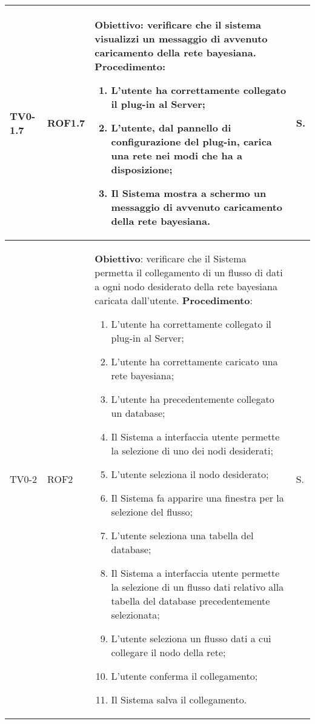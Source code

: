 \begin{longtable}{|C{.15\textwidth}|C{.13\textwidth}|m{.65\textwidth}|C{.08\textwidth}|}
TV0-1.7 & ROF1.7 &
	\textbf{Obiettivo}: verificare che il sistema visualizzi un messaggio di avvenuto caricamento della rete bayesiana. \newline
	\textbf{Procedimento}:
	\begin{enumerate}
		\item L'utente ha correttamente collegato il plug-in al Server;
		\item L'utente, dal pannello di configurazione del plug-in, carica una rete nei modi che ha a disposizione;
		\item Il Sistema mostra a schermo un messaggio di avvenuto caricamento della rete bayesiana.
	\end{enumerate} & S. \\
\hline

TV0-2 & ROF2 &
	\textbf{Obiettivo}: verificare che il Sistema permetta il collegamento di un flusso di dati a ogni nodo desiderato della rete bayesiana caricata dall'utente. \newline
	\textbf{Procedimento}:
	\begin{enumerate}
		\item L'utente ha correttamente collegato il plug-in al Server;
		\item L'utente ha correttamente caricato una rete bayesiana;
		\item L'utente ha precedentemente collegato un database;
		\item Il Sistema a interfaccia utente permette la selezione di uno dei nodi desiderati;
		\item L'utente seleziona il nodo desiderato;
		\item Il Sistema fa apparire una finestra per la selezione del flusso;
		\item L'utente seleziona una tabella del database;
		\item Il Sistema a interfaccia utente permette la selezione di un flusso dati relativo alla tabella del database precedentemente selezionata;
		\item L'utente seleziona un flusso dati a cui collegare il nodo della rete;
		\item L'utente conferma il collegamento;
		\item Il Sistema salva il collegamento.
	\end{enumerate}
	& S. \\
\hline


\end{longtable}
